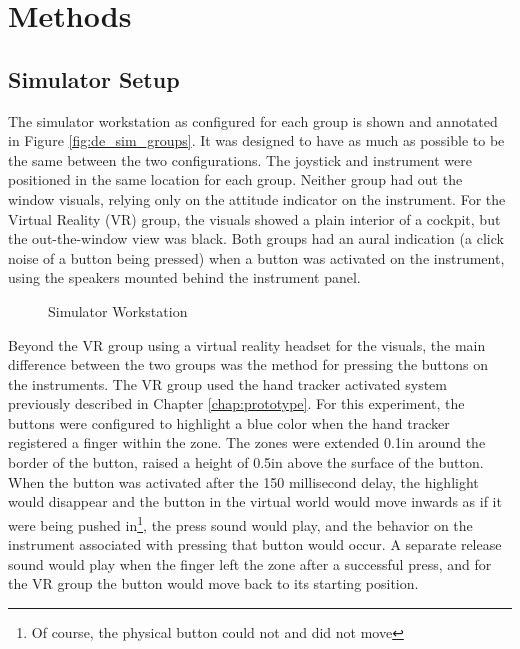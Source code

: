 \section{Methods}

\subsection{Simulator Setup}

The simulator workstation as configured for each group is shown and annotated in Figure \ref{fig:de_sim_groups}.
It was designed to have as much as possible to be the same between the two configurations.
The joystick and instrument were positioned in the same location for each group.
Neither group had out the window visuals, relying only on the attitude indicator on the instrument.
For the Virtual Reality (VR) group, the visuals showed a plain interior of a cockpit, but the out-the-window view was black.
Both groups had an aural indication (a click noise of a button being pressed) when a button was activated on the instrument, using the speakers mounted behind the instrument panel.

\begin{figure}
    \centering
    \caption{Simulator Workstation}
    \label{fig:de_simgroups}
\end{figure}

Beyond the VR group using a virtual reality headset for the visuals, the main difference between the two groups was the method for pressing the buttons on the instruments.
The VR group used the hand tracker activated system previously described in Chapter \autoref{chap:prototype}.
For this experiment, the buttons were configured to highlight a blue color when the hand tracker registered a finger within the zone.
The zones were extended 0.1in around the border of the button, raised a height of 0.5in above the surface of the button.
When the button was activated after the 150 millisecond delay, the highlight would disappear and the button in the virtual world would move inwards as if it were being pushed in\footnote{Of course, the physical button could not and did not move}, the press sound would play, and the behavior on the instrument associated with pressing that button would occur.
A separate release sound would play when the finger left the zone after a successful press, and for the VR group the button would move back to its starting position.

